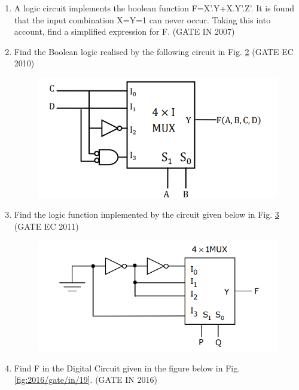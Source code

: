 \begin{enumerate}
\begin{figure}[H]
\caption{}
\label{fig:2007-gate-ec-43}
\end{figure}
\item 
\label{prob:2007-gate-in-10}
      A logic circuit implements the boolean function F=X'.Y+X.Y'.Z'. It is found that the input combination X=Y=1 can never occur. Taking this into account, find a simplified expression for F. 
\hfill (GATE IN 2007)
\item 
\label{prob:2010-gate-ec-39}
Find the Boolean logic realised by the following circuit in Fig.
\ref{fig:2010-gate-ec-39}
\hfill (GATE EC 2010)
\begin{figure}[H]
\centering
	\includegraphics[width=1\columnwidth]{figs/2010-gate-ec-39.png}
\caption{}
\label{fig:2010-gate-ec-39}
\end{figure}
\item 
\label{prob:2011-gate-ec-20}
Find the logic function implemented by the circuit given below 
in Fig.
\ref{fig:2011-gate-ec-20}
\hfill (GATE EC 2011)
\begin{figure}[H]
\centering
	\includegraphics[width=\columnwidth]{figs/2011-gate-ec-20.png}
\caption{}
\label{fig:2011-gate-ec-20}
\end{figure}
\item
\label{prob:2016/gate/in/19}
Find F in the Digital Circuit given in the figure below
in Fig. \ref{fig:2016/gate/in/19}.
\hfill (GATE IN 2016)
\begin{figure}[H]
	\centering
\begin{tikzpicture}
 


\end{tikzpicture}
\end{figure}
\end{enumerate}
